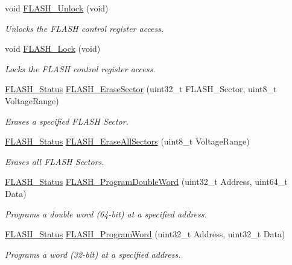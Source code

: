 \begin{DoxyCompactItemize}
void \hyperlink{group___f_l_a_s_h_ga4084d0184bab463a1579271bf474aaef}{F\-L\-A\-S\-H\-\_\-\-Unlock} (void)
\begin{DoxyCompactList}\small\item\em Unlocks the F\-L\-A\-S\-H control register access. \end{DoxyCompactList}\item 
void \hyperlink{group___f_l_a_s_h_ga46899557353c4312ddbe3f25e65df1d8}{F\-L\-A\-S\-H\-\_\-\-Lock} (void)
\begin{DoxyCompactList}\small\item\em Locks the F\-L\-A\-S\-H control register access. \end{DoxyCompactList}\item 
\hyperlink{group___f_l_a_s_h_gadc63a6f3404ff1f71229a66915e9cdc0}{F\-L\-A\-S\-H\-\_\-\-Status} \hyperlink{group___f_l_a_s_h_ga48f408290b32a3aebbcad83a00fc447c}{F\-L\-A\-S\-H\-\_\-\-Erase\-Sector} (uint32\-\_\-t F\-L\-A\-S\-H\-\_\-\-Sector, uint8\-\_\-t Voltage\-Range)
\begin{DoxyCompactList}\small\item\em Erases a specified F\-L\-A\-S\-H Sector. \end{DoxyCompactList}\item 
\hyperlink{group___f_l_a_s_h_gadc63a6f3404ff1f71229a66915e9cdc0}{F\-L\-A\-S\-H\-\_\-\-Status} \hyperlink{group___f_l_a_s_h_ga2aee006e5f4db4280bdedd401dfa50f9}{F\-L\-A\-S\-H\-\_\-\-Erase\-All\-Sectors} (uint8\-\_\-t Voltage\-Range)
\begin{DoxyCompactList}\small\item\em Erases all F\-L\-A\-S\-H Sectors. \end{DoxyCompactList}\item 
\hyperlink{group___f_l_a_s_h_gadc63a6f3404ff1f71229a66915e9cdc0}{F\-L\-A\-S\-H\-\_\-\-Status} \hyperlink{group___f_l_a_s_h_gab84b52121e58d0dbc8ff2a92145d20f2}{F\-L\-A\-S\-H\-\_\-\-Program\-Double\-Word} (uint32\-\_\-t Address, uint64\-\_\-t Data)
\begin{DoxyCompactList}\small\item\em Programs a double word (64-\/bit) at a specified address. \end{DoxyCompactList}\item 
\hyperlink{group___f_l_a_s_h_gadc63a6f3404ff1f71229a66915e9cdc0}{F\-L\-A\-S\-H\-\_\-\-Status} \hyperlink{group___f_l_a_s_h_gaac9a2f400b92537bd42a6bd7cc237b11}{F\-L\-A\-S\-H\-\_\-\-Program\-Word} (uint32\-\_\-t Address, uint32\-\_\-t Data)
\begin{DoxyCompactList}\small\item\em Programs a word (32-\/bit) at a specified address. \end{DoxyCompactList}\item 

\end{DoxyCompactItemize}
